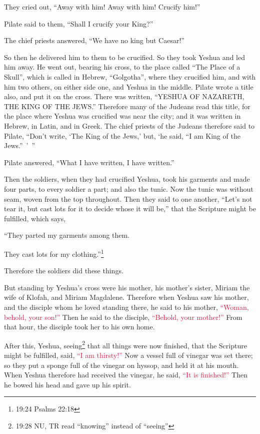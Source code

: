 \myverse{}They cried out, “Away with him! Away with him! Crucify him!”

Pilate said to them, “Shall I crucify your King?”

The chief priests answered, “We have no king but Caesar!”

\myverse{}So then he delivered him to them to be crucified. So they took
Yeshua and led him away.
\myverse{}He went out, bearing his cross, to the place called “The Place of a Skull”,
which is called in Hebrew, “Golgotha”,
\myverse{}where they crucified him, and with him two others, on either side one, and
Yeshua in the middle.
\myverse{}Pilate wrote a title also, and put it on the cross. There was written, “YESHUA
OF NAZARETH, THE KING OF THE JEWS.”
\myverse{}Therefore many of the Judeans read this title, for the place where Yeshua
was crucified was near the city; and it was written in Hebrew, in Latin, and in Greek.
\myverse{}The chief priests of the Judeans therefore said to Pilate, “Don’t write,
‘The King of the Jews,’ but, ‘he said, “I am King of the Jews.” ’ ”

\myverse{}Pilate answered, “What I have written, I have written.”

\myverse{}Then the soldiers, when they had crucified Yeshua, took his
garments and made four parts, to every soldier a part; and also the tunic. Now the tunic was without seam,
woven from the top throughout.
\myverse{}Then they said to one another, “Let’s not tear it, but cast lots for it to
decide whose it will be,” that the Scripture might be fulfilled, which says,

“They parted my garments among them.

They cast lots for my clothing.”\footnote{19:24 Psalms 22:18}

Therefore the soldiers did these things.

\myverse{}But standing by Yeshua’s cross were his mother, his mother’s
sister, Miriam the wife of Klofah, and Miriam Magdalene.
\myverse{}Therefore when Yeshua saw his mother, and the disciple whom he loved standing
there, he said to his mother,
\textcolor{crimson}{“Woman, behold, your son!”
}
\myverse{}Then he said to the disciple,
\textcolor{crimson}{“Behold, your mother!”} From that hour, the disciple took her to his own home.

\myverse{}After this, Yeshua, seeing\footnote{19:28 NU, TR read “knowing” instead of “seeing”
} that all things were now finished, that the Scripture might be fulfilled, said,
\textcolor{crimson}{“I am thirsty!”}
\myverse{}Now a vessel full of vinegar was set there; so they put a sponge full of
the vinegar on hyssop, and held it at his mouth.
\myverse{}When Yeshua therefore had received the vinegar, he said,
\textcolor{crimson}{“It is finished!”} Then he bowed his head and gave up his spirit.

